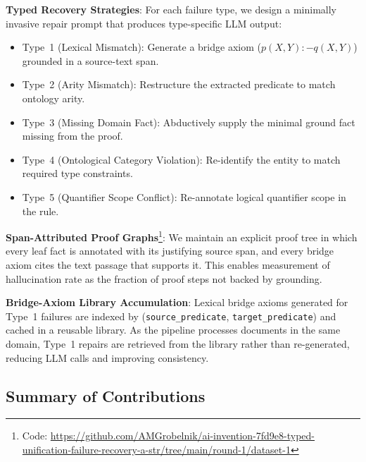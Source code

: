 \documentclass[11pt,letterpaper]{article}
\begin{document}
\textbf{Typed Recovery Strategies}: For each failure type, we design a minimally invasive repair prompt that produces type-specific LLM output:
\begin{itemize}
  \item Type~1 (Lexical Mismatch): Generate a bridge axiom ($p(X,Y) \mathbin{:-} q(X,Y)$) grounded in a source-text span.
  \item Type~2 (Arity Mismatch): Restructure the extracted predicate to match ontology arity.
  \item Type~3 (Missing Domain Fact): Abductively supply the minimal ground fact missing from the proof.
  \item Type~4 (Ontological Category Violation): Re-identify the entity to match required type constraints.
  \item Type~5 (Quantifier Scope Conflict): Re-annotate logical quantifier scope in the rule.
\end{itemize}

\textbf{Span-Attributed Proof Graphs}\footnote{Code: \url{https://github.com/AMGrobelnik/ai-invention-7fd9e8-typed-unification-failure-recovery-a-str/tree/main/round-1/dataset-1}}: We maintain an explicit proof tree in which every leaf fact is annotated with its justifying source span, and every bridge axiom cites the text passage that supports it. This enables measurement of hallucination rate as the fraction of proof steps not backed by grounding.

\textbf{Bridge-Axiom Library Accumulation}: Lexical bridge axioms generated for Type~1 failures are indexed by (\texttt{source\_predicate}, \texttt{target\_predicate}) and cached in a reusable library. As the pipeline processes documents in the same domain, Type~1 repairs are retrieved from the library rather than re-generated, reducing LLM calls and improving consistency.

\subsection{Summary of Contributions}
\end{document}
